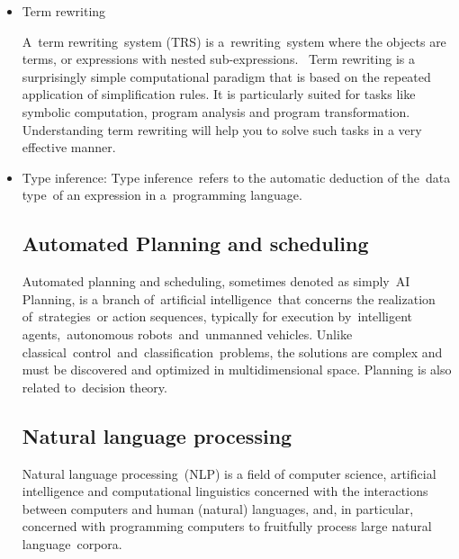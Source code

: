 \documentclass[14pt]{article}
\begin{document}
\begin{itemize}
\item Term rewriting

A term rewriting system (TRS) is a rewriting system where the objects are terms, or expressions with nested sub-expressions. 
Term rewriting is a surprisingly simple computational paradigm that is based on the repeated application of simplification rules. It is particularly suited for tasks like symbolic computation, program analysis and program transformation. Understanding term rewriting will help you to solve such tasks in a very effective manner.

\item Type inference: 
Type inference refers to the automatic deduction of the data type of an expression in a programming language.

\subsection{Automated Planning and scheduling}

Automated planning and scheduling, sometimes denoted as simply AI 
Planning, is a branch of artificial intelligence that concerns the realization of strategies or action sequences, typically for execution by intelligent agents, autonomous robots and unmanned vehicles. Unlike classical control and classification problems, the solutions are complex and must be discovered and optimized in multidimensional space. Planning is also related to decision theory.


\subsection{Natural language processing}

Natural language processing (NLP) is a field of computer science, artificial intelligence and computational linguistics concerned with the interactions between computers and human (natural) languages, and, in particular, concerned with programming computers to fruitfully process large natural language corpora.

\end{itemize}
\newpage 
\end{document}
